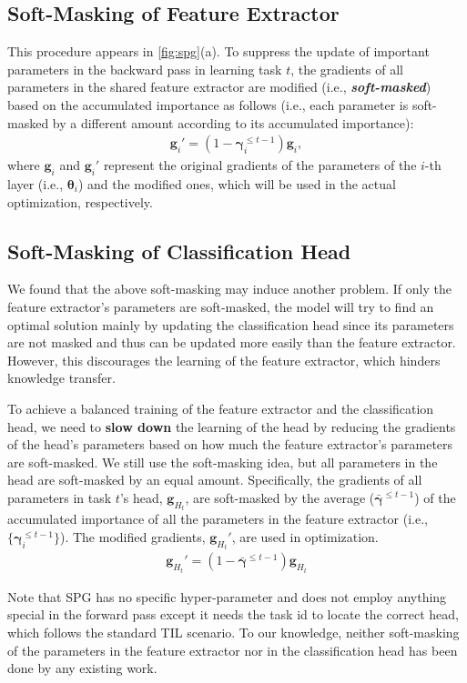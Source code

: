 \subsection{Soft-Masking of Feature Extractor} \label{sec:training_phase}
This procedure appears in \cref{fig:spg}(a).
To suppress the update of important parameters in the backward pass in learning task $t$, the gradients of all parameters in the shared feature extractor are modified (i.e., \textit{\textbf{soft-masked}}) based on the accumulated importance as follows (i.e., each parameter is soft-masked by a different amount according to its accumulated importance): 
\begin{gather}
\bm{g}_i' = \left( 1 - \bm{\gamma}_i^{\le t-1} \right) \bm{g}_i, \label{eq:g_i_prime}
\end{gather}
where $\bm{g}_i$ and $\bm{g}_i'$ represent the original gradients of the parameters of the $i$-th layer (i.e., $\bm{\theta}_i$) and the modified ones, which will be used in the actual optimization, respectively.


\subsection{Soft-Masking of Classification Head}
We found that the above soft-masking may induce another problem.
If only the feature extractor's parameters are soft-masked, the model will try to find an optimal solution mainly by updating the classification head since its parameters are not masked and thus can be updated more easily than the feature extractor. However, this discourages the learning of the feature extractor, which hinders knowledge transfer.

To achieve a balanced training of the feature extractor and the classification head,
we need to \textbf{slow down} the learning of the head by reducing the gradients of the head's parameters based on how much the feature extractor's parameters are soft-masked. 
We still use the soft-masking idea, but all parameters in the head are soft-masked by an equal amount.
Specifically, the gradients of all parameters in task $t$'s head, $\bm{g}_{H_t}$, are soft-masked by the average ($\bar{\bm{\gamma}}^{\le t-1}$) of the accumulated importance of all the parameters in the feature extractor (i.e., $\{ \bm{\gamma}_i^{\le t-1} \}$). The modified gradients, $\bm{g}_{H_t}'$, are used in optimization. 
 \begin{gather}
\bm{g}_{H_t}' = \left( 1 - \bar{\bm{\gamma}}^{\le t-1} \right) \bm{g}_{H_t} \label{eq:g_ht_prime}
 \end{gather}
 
Note that SPG has no specific hyper-parameter and does not employ anything special in the forward pass except it needs the task id to locate the correct head, which follows the standard TIL scenario.  
To our knowledge, neither soft-masking of the parameters in the feature extractor nor in the classification head has been done by any existing work.

